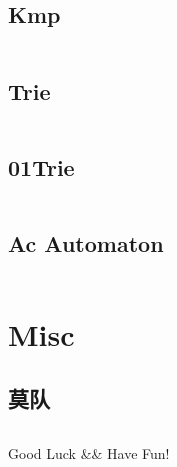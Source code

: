 \documentclass[titlepage, a4paper]{article}
\begin{document}
\begin{multicols}{2}
\begin{spacing}{0.6}
			 	\subsection{Kmp}
			 		\inputminted{cpp}{src/String/Kmp.cpp}
			 	\subsection{Trie}
			 		\inputminted{cpp}{src/String/Trie.cpp}
			 	\subsection{01Trie}
			 		\inputminted{cpp}{src/String/01_trie.cpp}
			 	\subsection{Ac Automaton}
			 		\inputminted{cpp}{src/String/Ac_automaton.cpp}
			 \section{Misc}
			 	\subsection{莫队}
			 		\inputminted{cpp}{src/Misc/Mo.cpp}
		\end{spacing}
			\endgroup
	\end{multicols}
	
	\begin{center}
		\LARGE{Good Luck \&\& Have Fun!}
	\end{center}
		
	
\end{document}
